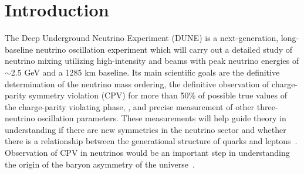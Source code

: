 \section{Introduction}
\label{sec:intro}

The Deep Underground Neutrino Experiment (DUNE) is a next-generation, long-baseline neutrino oscillation experiment which will carry out a detailed study of neutrino mixing utilizing high-intensity \numu and \anumu beams with peak neutrino energies of $\sim$2.5 GeV and a 1285 km baseline. Its main scientific goals are the definitive determination of the neutrino mass ordering, the definitive observation of charge-parity symmetry violation (CPV) for more than 50\% of possible true values of the charge-parity violating phase, \deltacp, and precise measurement of other three-neutrino oscillation parameters.
These measurements will help guide theory in understanding if there are new symmetries in the neutrino sector and whether there is a relationship between the generational structure of quarks and leptons~\cite{Qian:2015waa}. Observation of CPV in neutrinos would be an important step in understanding the origin of the baryon asymmetry of the universe~\cite{Fukugita:1986hr, Davidson:2008bu}.


